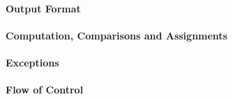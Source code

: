 \paragraph{Output Format}
\begin{itemize}
\end{itemize}

\paragraph{Computation, Comparisons and Assignments}
\begin{itemize}
\end{itemize}

\paragraph{Exceptions}
\begin{itemize}
\end{itemize}

\paragraph{Flow of Control}
\begin{itemize}
\end{itemize}

